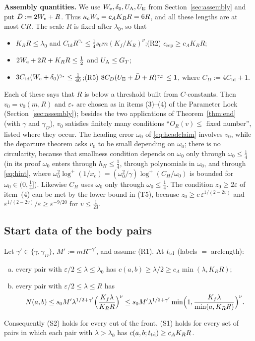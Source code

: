 \textbf{Assembly quantities.} We use $W_{\mathrm{e}},\delta_0,U_{\mathrm{A}},U_{\mathrm{E}}$ from Section~\ref{sec:assembly} and put $\bar D:=2W_{\mathrm{e}}+R$.
Thus $\kappa_cW_{\mathrm{e}}=c_AK_RR=6R$, and all these lengths are at most $CR$. The scale $R$ is fixed after $\lambda_0$, so that
\begin{itemize}\setlength{\itemsep}{1pt}
\item[(R1)] $K_RR\le\lambda_0$ and $C_{\mathrm{td}}R^{\gamma_*}\le\frac14s_0m(K_f/K_R)^\nu$;\qquad (R2) $c_{\mathrm{sep}}\ge c_AK_RR$;
\item[(R3)] $2W_{\mathrm{e}}+2R+K_RR\le\frac12$ and $U_{\mathrm{A}}\le G_T$;
\item[(R4)] $3C_{\mathrm{td}}(W_{\mathrm{e}}+\delta_0)^{\gamma_*}\le\frac1{40}$;\qquad (R5) $8C_D(U_{\mathrm{E}}+\bar D+R)^{\gamma_D}\le1$, where
$C_D:=4C_{\mathrm{td}}+1$.
\end{itemize}
Each of these says that $R$ is below a threshold built from $C$-constants. Then $v_0=v_0(m,R)$ and $\varepsilon_*$ are
chosen as in items (3)--(4) of the Parameter Lock (Section~\ref{sec:assembly}); besides the two applications of
Theorem~\ref{thm:end} (with $\gamma$ and $\gamma_D$), $v_0$ satisfies finitely many conditions ``$O_R(v)\le$ fixed
number'', listed where they occur. The
heading error $\omega_0$ of \eqref{eq:headclaim} involves $v_0$, while the departure theorem asks $v_0$ to be small
depending on $\omega_0$; there is no circularity, because that smallness condition depends on $\omega_0$ only through
$\omega_0\le\frac14$ (in its proof $\omega_0$ enters through $h_H\le\frac14$, through polynomials in $\omega_0$, and through
\eqref{eq:hint}, where $\omega_0^2\log^+(1/x_c)=(\omega_0^2/\gamma)\log^+(C_H/\omega_0)$ is bounded for
$\omega_0\in(0,\frac14]$). Likewise $C_H$ uses $\omega_0$ only through $\omega_0\le\frac14$. The condition
$z_0\ge2\varepsilon$ of item~(4) can be met by the lower bound in (T5), because $z_0\ge c\,\varepsilon^{1/(2-2v)}$ and
$\varepsilon^{1/(2-2v)}/\varepsilon\ge\varepsilon^{-9/20}$ for $v\le\frac1{23}$.

\subsection{Start data of the body pairs}\label{appC:start}

\begin{lemma}\label{lem:startchord}
Let $\gamma'\in\{\gamma,\gamma_D\}$, $M':=mR^{-\gamma'}$, and assume \textup{(R1)}. At $t_{\mathrm{td}}$ (labels $=$ arclength):
\begin{enumerate}[(a)]\setlength{\itemsep}{1pt}
\item every pair with $\varepsilon/2\le\lambda\le\lambda_0$ has $c(a,b)\ge\lambda/2\ge c_A\min(\lambda,K_RR)$;
\item every pair with $\varepsilon/2\le\lambda\le R$ has
\[
N(a,b)\le s_0M'\lambda^{1/2+\gamma'}\Bigl(\frac{K_f\lambda}{K_RR}\Bigr)^\nu\le s_0M'\lambda^{1/2+\gamma'}\min\Bigl(1,\frac{K_f\lambda}{\min(a,K_RR)}\Bigr)^\nu .
\]
\end{enumerate}
Consequently \textup{(S2)} holds for every cut of the front. \textup{(S1)} holds for every set of pairs in which each
pair with $\lambda>\lambda_0$ has $c(a,b;t_{\mathrm{td}})\ge c_AK_RR$.
\end{lemma}

